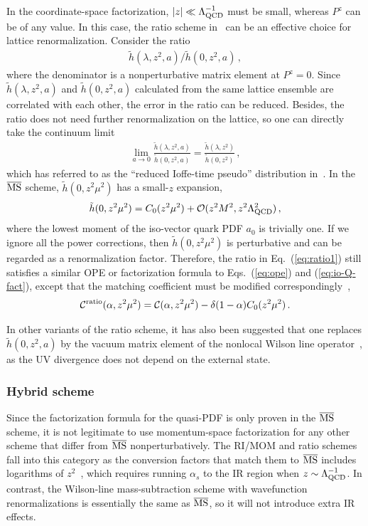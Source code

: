 \documentclass[aps,rmp,reprint,amsmath,amssymb,graphicx,longbibliography]{revtex4-1} %
\newcommand{\MS}{{\overline{\rm MS}}}
\newcommand{\beq}{\begin{eqnarray}}
\newcommand{\eeq}{\end{eqnarray}}
\DeclareRobustCommand{\eq}[1]{Eq.~(\ref{eq:#1})}
\DeclareRobustCommand{\eqs}[2]{Eqs.~(\ref{eq:#1}) and (\ref{eq:#2})}
\begin{document}
In the coordinate-space factorization, $|z|\ll \Lambda^{-1}_{\rm QCD}$ must be small, whereas
$P^z$ can be of any value. In this case, the ratio scheme in~\cite{Radyushkin:2017cyf,Orginos:2017kos} can be an effective choice for lattice renormalization.
Consider the ratio
\beq \label{eq:ratio}
\tilde{h}(\lambda,z^2,a)/\tilde{h}(0,z^2,a)\,,
\eeq
where the denominator is a nonperturbative matrix element at $P^z=0$. Since $\tilde{h}(\lambda,z^2,a)$ and $\tilde{h}(0,z^2,a)$ calculated from the same lattice ensemble are correlated with each other, the error in the ratio can be reduced.
Besides, the ratio does not need further renormalization on the lattice, so one can directly take the continuum limit
\begin{align} \label{eq:ratio1}
	\lim_{a\to0}\frac{\tilde{h}(\lambda,z^2,a)}{\tilde{h}(0,z^2,a)} = \frac{\tilde{h}(\lambda,z^2)}{\tilde{h}(0,z^2)}\,,
\end{align}
which has referred to as the ``reduced Ioffe-time pseudo'' distribution in~\cite{Radyushkin:2017cyf,Orginos:2017kos}.
In the $\MS$ scheme, $\tilde{h}(0,z^2\mu^2)$ has a small-$z$ expansion,
\begin{align}
	\tilde{h}(0,z^2\mu^2) = C_0(z^2\mu^2) + {\cal O}(z^2M^2, z^2\Lambda_{\rm QCD}^2)\,,
\end{align}
where the lowest moment of the iso-vector quark PDF $a_0$ is trivially one.
If we ignore all the power corrections, then $\tilde{h}(0,z^2\mu^2)$ is perturbative and can be regarded as a renormalization factor. Therefore, the ratio in \eq{ratio1} still satisfies a similar OPE or factorization formula to \eqs{ope}{io-Q-fact}, except that the matching coefficient must be modified correspondingly~\cite{Radyushkin:2017lvu,Izubuchi:2018srq},
\begin{align}
	{\cal C}^{\rm ratio}(\alpha,z^2\mu^2)= {\cal C}(\alpha,z^2\mu^2) - \delta(1-\alpha)C_0(z^2\mu^2)\,.
\end{align}

In other variants of the ratio scheme, it has also been suggested that one replaces $\tilde{h}(0,z^2,a)$ by the vacuum matrix element of the nonlocal Wilson line operator~\cite{Braun:2018brg,Li:2020xml}, as the UV divergence does not depend on the external state.


\subsubsection{Hybrid scheme}
\label{sec:hybrid}

Since the factorization formula for the quasi-PDF is only proven in the $\MS$ scheme, it is not legitimate to use momentum-space factorization for any other scheme that differ from $\MS$ nonperturbatively. The RI/MOM and ratio schemes fall into this category as the conversion factors that match them to $\MS$ includes logarithms of $z^2$~\cite{Constantinou:2017sej,Izubuchi:2018srq}, which requires running $\alpha_s$ to the IR region when $z\sim \Lambda_{\rm QCD}^{-1}$. In contrast, the Wilson-line mass-subtraction scheme with wavefunction renormalizations is essentially the same as $\MS$, so it will not introduce extra IR effects.
\end{document}
